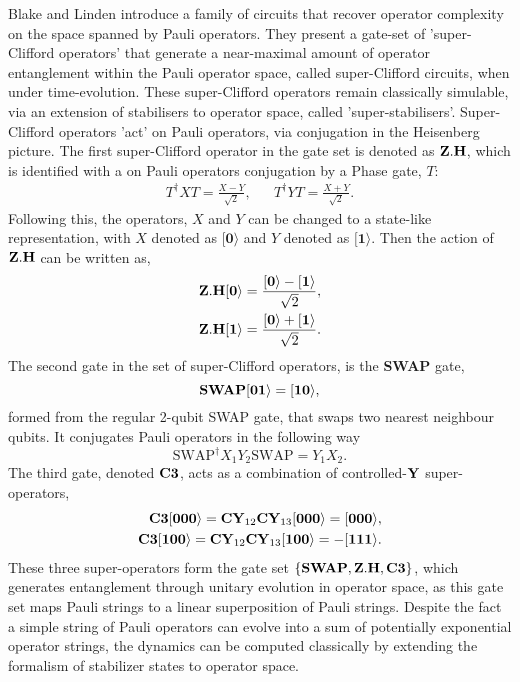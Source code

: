 Blake and Linden \cite{Blake2020} introduce a family of circuits that recover operator complexity on the space spanned by Pauli operators.
They present a gate-set of 'super-Clifford operators' that generate a near-maximal amount of operator entanglement
within the Pauli operator space, called super-Clifford circuits, when under time-evolution. These super-Clifford operators
remain classically simulable, via an extension of stabilisers to operator space, called 'super-stabilisers'.
Super-Clifford operators 'act' on Pauli operators, via conjugation in the Heisenberg picture.
The first super-Clifford operator in the gate set is denoted as ${\bf Z.H}$, which is identified with a on Pauli operators
conjugation by a Phase gate, $T$:
\begin{align}\label{phasegate}
  T^{\dagger} X T = \frac{X - Y}{\sqrt{2}}, &  & T^{\dagger} Y T = \frac{X + Y}{\sqrt{2}}.
\end{align}
Following this, the operators, $X$ and $Y$ can be changed to a state-like representation, with
$X$ denoted as $[{\mathbf 0}\rangle$ and $Y$ denoted as $[{\mathbf 1}\rangle$. Then the action of $\bf Z.H$
can be written as,
\begin{align}
  {\bf Z.H}[{\bf 0}\rangle = \frac{[{\bf 0}\rangle - [{\bf 1}\rangle}{\sqrt{2}}, \\
  {\bf Z.H}[{\bf 1}\rangle = \frac{[{\bf 0}\rangle + [{\bf 1}\rangle}{\sqrt{2}}.
\end{align}
The second gate in the set of super-Clifford operators, is the {\bf SWAP} gate,
\begin{equation}
  \text{\bf SWAP} [{\bf 01}\rangle = [{\bf 10}\rangle,
\end{equation}
formed from the regular 2-qubit SWAP gate, that swaps two nearest neighbour qubits. It conjugates
Pauli operators in the following way
\begin{equation}
  \text{SWAP}^{\dagger} X_1Y_2 \text{SWAP} = Y_1X_2.
\end{equation}
The third gate, denoted $\bf C3$, acts as a combination of controlled-$\text{\bf Y}$ super-operators,
\begin{align}
  {\bf C3} [{\bf 000}\rangle=  {\bf CY}_{12}{\bf CY}_{13} [{\bf000}\rangle = [{\bf 000}\rangle, \\
  {\bf C3} [{\bf 100}\rangle=  {\bf CY}_{12}{\bf CY}_{13} [{\bf100}\rangle = -[{\bf 111}\rangle.
\end{align}
These three super-operators form the gate set $\{ {\bf SWAP}, {\bf Z.H}, {\bf C3}\}$, which generates entanglement
through unitary evolution in operator space, as this gate set maps Pauli strings to a linear superposition of Pauli strings.
Despite the fact a simple string of Pauli operators can evolve into a sum of potentially exponential operator strings,
the dynamics can be computed classically by extending the formalism of stabilizer states to operator space. 

